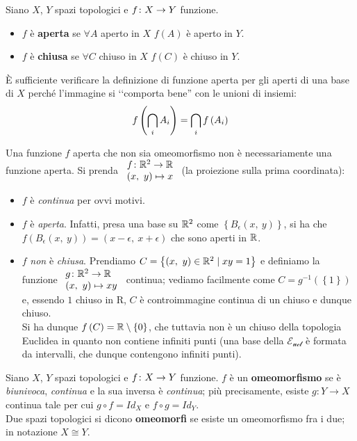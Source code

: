 \begin{define}
Siano $X$, $Y$ spazi topologici e $f\colon X\rightarrow Y$ funzione.
\begin{itemize}
\item $f$ è \textbf{aperta} se $\forall A$ aperto in $X$ $f\left(A\right)$ è aperto in $Y$.
\item $f$ è \textbf{chiusa} se $\forall C$ chiuso in $X$ $f\left(C\right)$ è chiuso in $Y$.
\end{itemize}
\end{define}
\begin{observe}
	È sufficiente verificare la definizione di funzione aperta per gli aperti di una base di $X$ perché l'immagine si ‘‘comporta bene'' con le unioni di insiemi:
	\begin{equation*}
		f\left(\mathop{{\bigcap}}\displaylimits_{i}A_i\right)=\mathop{{\bigcap}}\displaylimits_{i}f\left(A_i\right)
	\end{equation*}
\end{observe}
\begin{attention}
	Una funzione $f$ aperta che non sia omeomorfismo non è necessariamente una funzione aperta. Si prenda $\funztot{f}{\realset^2}{\realset}{\left(x,\ y\right)}{x}$ (la proiezione sulla prima coordinata):
	\begin{itemize}
		\item $f$ è \textit{continua} per ovvi motivi.
		\item $f$ è \textit{aperta}. Infatti, presa una base su $\mathbb{R}^2$ come $\left\{B_{\epsilon}\left(x,\ y\right)\right\}$, si ha che $f\left(B_{\epsilon}\left(x,\ y\right)\right)=\left(x-\epsilon,\ x+\epsilon\right)$ che sono aperti in $\mathbb{R}$.
		\item $f$ \textit{non} è \textit{chiusa}. Prendiamo $C=\left\{\left(x,\ y\right)\in \mathbb{R}^2\mid xy=1 \right\}$ e definiamo la funzione $\funztot{g}{\realset^2}{\realset}{\left(x,\ y\right)}{xy}$ continua; vediamo facilmente come $C=g^{-1}\left(\left\{1\right\}\right)$ e, essendo ${1}$ chiuso in $\mathrm{R}$, $C$ è controimmagine continua di un chiuso e dunque chiuso.\\
		Si ha dunque $f\left(C\right)=\mathbb{R}\setminus\left\{0\right\}$, che tuttavia non è un chiuso della topologia Euclidea in quanto non contiene infiniti punti (una base della $\mathcal{E_{ucl}}$ è formata da intervalli, che dunque contengono infiniti punti).
	\end{itemize}
\end{attention}
\begin{define}
Siano $X$, $Y$ spazi topologici e $f\colon X\rightarrow Y$ funzione. $f$ è un \textbf{omeomorfismo} se è \textit{biunivoca}, \textit{continua} e la sua inversa è \textit{continua}; più precisamente, esiste $g\colon Y\rightarrow X$ continua tale per cui $g\circ f = Id_{X}$ e $f\circ g = Id_{Y}$.\\
Due spazi topologici si dicono \textbf{omeomorfi} se esiste un omeomorfismo fra i due; in notazione $X\cong Y$.
\end{define}
